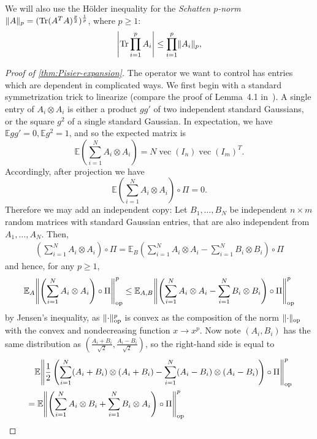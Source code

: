 \documentclass[aos]{imsart}
\theoremstyle{definition}
\numberwithin{equation}{section}
\DeclareMathOperator{\op}{op}
\DeclareMathOperator{\tr}{Tr}
\DeclareMathOperator{\vect}{vec}
\DeclarePairedDelimiter{\abs}{\lvert}{\rvert}
\DeclarePairedDelimiter{\norm}{\lVert}{\rVert}
\newcommand{\E}{\mathbb{E}}
\begin{document}
\begin{appendix}
We will also use the H\"older inequality for the \emph{Schatten $p$-norm} $\norm{A}_p = (\tr(A^TA)^{\frac p2})^{\frac1p}$, where $p\geq1$:
\begin{align}\label{eq:holder}
  \abs*{\tr \prod_{i=1}^{p} A_i} \leq \prod_{i=1}^{p} \norm{A_i}_p,
\end{align}

\begin{proof} [Proof of \cref{thm:Pisier-expansion}]
The operator we want to control has entries which are dependent in complicated ways.
We first begin with a standard symmetrization trick to linearize (compare the proof of Lemma~4.1 in~\cite{P14}).
A single entry of $A_i \otimes A_i$ is either a product $g g'$ of two independent standard Gaussians, or the square $g^2$ of a single standard Gaussian.
In expectation, we have $\E g g' = 0, \E g^{2} = 1$, and so the expected matrix is
\[ \E \left( \sum_{i=1}^N A_i \otimes A_i \right) = N \vect(I_n) \vect(I_m)^T. \]
Accordingly, after projection we have
\[ \E \left( \sum_{i=1}^N A_i \otimes A_i \right) \circ \Pi = 0. \]
Therefore we may add an independent copy:
Let $B_1,\dots,B_N$ be independent $n\times m$ random matrices with standard Gaussian entries, that are also independent from~$A_1,\dots,A_N$.
Then,
\begin{align*}
  \left( \sum_{i=1}^N A_i \otimes A_i \right) \circ \Pi
= \E_B \left( \sum_{i=1}^N A_i \otimes A_i - \sum_{i=1}^N B_i \otimes B_i \right) \circ \Pi
\end{align*}
and hence, for any $p\geq1$,
\begin{align*}
  \E_{A} \norm*{\left( \sum_{i=1}^N A_i \otimes A_i \right) \circ \Pi}_{\op}^p
\leq \E_{A,B} \norm*{\left( \sum_{i=1}^N A_i \otimes A_i - \sum_{i=1}^N B_i \otimes B_i \right) \circ \Pi}_{\op}^p
\end{align*}
by Jensen's inequality, as $\norm{\cdot}_{\op}^p$ is convex as the composition of the norm $\norm{\cdot}_{\op}$ with the convex and nondecreasing function $x \to x^{p}$.
Now note $(A_i,B_i)$ has the same distribution as $(\frac{A_i+B_i}{\sqrt2},\frac{A_i-B_i}{\sqrt2})$, so the right-hand side is equal to
\begin{align*}
&\quad \E \norm*{ \frac{1}{2} \left( \sum_{i=1}^N (A_i + B_i) \otimes (A_i + B_i) - \sum_{i=1}^N (A_i - B_i) \otimes(A_i - B_i) \right) \circ \Pi}_{\op}^p \\
&= \E \norm*{\left( \sum_{i=1}^N A_i \otimes B_i + \sum_{i=1}^N B_i \otimes A_i \right) \circ \Pi}_{\op}^p

\end{align*}
\end{proof}
\end{appendix}
\end{document}
